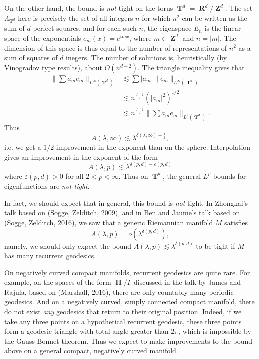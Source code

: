\documentclass{article}
\DeclareMathOperator{\ZZ}{\mathbf{Z}}
\DeclareMathOperator{\RR}{\mathbf{R}}
\DeclareMathOperator{\HH}{\mathbf{H}}
\DeclareMathOperator{\TT}{\mathbf{T}}
\theoremstyle{plain}
\theoremstyle{remark}
\theoremstyle{definition}
\begin{document}
On the other hand, the bound is \emph{not} tight on the torus $\TT^d = \RR^d / \ZZ^d$. The set $\Lambda_{\TT^d}$ here is precisely the set of all integers $n$ for which $n^2$ can be written as the sum of $d$ perfect squares, and for each such $n$, the eigenspace $E_n$ is the linear space of the exponentials $e_m(x) = e^{i m x}$, where $m \in \ZZ^d$ and $n = |m|$. The dimension of this space is thus equal to the number of representations of $n^2$ as a sum of squares of $d$ inegers. The number of solutions is, heuristically (by Vinogradov type results), about $O(n^{d-2})$. The triangle inequality gives that
%
\begin{align*}
    \| \sum a_m e_m \|_{L^\infty(\TT^d)} &\lesssim \sum |a_m| \| e_m \|_{L^\infty(\TT^d)}\\
    &\lesssim n^{\frac{d-2}{2}} \left( |a_m|^2 \right)^{1/2}\\
    &\lesssim n^{\frac{d-2}{2}} \| \sum a_m e_m \|_{L^2(\TT^d)}.
\end{align*}
%
Thus
%
\[ A(\lambda,\infty) \lesssim \lambda^{\delta(\lambda,\infty) - \frac{1}{2}}, \]
%
i.e. we get a $1/2$ improvement in the exponent than on the sphere. Interpolation gives an improvement in the exponent of the form
%
\[ A(\lambda,p) \lesssim \lambda^{\delta(p,d) - \varepsilon(p,d)} \]
%
where $\varepsilon(p,d) > 0$ for all $2 < p < \infty$. Thus on $\TT^d$, the general $L^p$ bounds for eigenfunctions are \emph{not tight}.

In fact, we should expect that in general, this bound is \emph{not} tight. In Zhongkai's talk based on (Sogge, Zelditch, 2009), and in Ben and Jaume's talk based on (Sogge, Zelditch, 2016), we saw that a generic Riemannian manifold $M$ satisfies
%
\[ A(\lambda,p) = o( \lambda^{\delta(p,d)} ), \]
%
namely, we should only expect the bound $A(\lambda,p) \lesssim \lambda^{\delta(p,d)}$ to be tight if $M$ has many recurrent geodesics.

On negatively curved compact manifolds, recurrent geodesics are quite rare. For example, on the spaces of the form $\HH / \Gamma$ discussed in the talk by James and Rajula, based on (Marshall, 2016), there are only countably many periodic geodesics. And on a negatively curved, simply connected compact manifold, there do not exist \emph{any} geodesics that return to their original position. Indeed, if we take any three points on a hypothetical recurrent geodesic, these three points form a geodesic triangle with total angle greater than $2\pi$, which is impossible by the Gauss-Bonnet theorem. Thus we expect to make improvements to the bound above on a general compact, negatively curved manifold.
\end{document}

